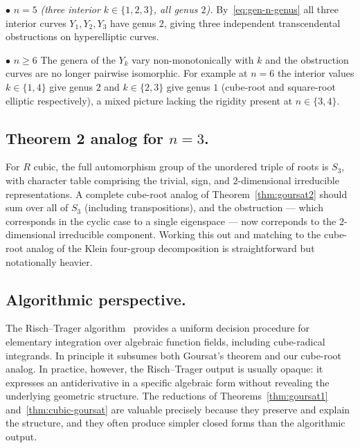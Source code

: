 \documentclass[11pt,a4paper]{article}
\theoremstyle{plain}
\theoremstyle{definition}
\theoremstyle{remark}
\begin{document}
\smallskip\noindent
$\bullet$ $\boxed{n=5}$ \emph{(three interior $k\in\{1,2,3\}$, all genus $2$).} By~\eqref{eq:gen-n-genus} all three interior curves $Y_1, Y_2, Y_3$ have genus $2$, giving three independent transcendental obstructions on hyperelliptic curves.

\smallskip\noindent
$\bullet$ $\boxed{n\geq 6}$ The genera of the $Y_k$ vary non-monotonically with $k$ and the obstruction curves are no longer pairwise isomorphic. For example at $n = 6$ the interior values $k\in\{1,4\}$ give genus $2$ and $k\in\{2,3\}$ give genus $1$ (cube-root and square-root elliptic respectively), a mixed picture lacking the rigidity present at $n\in\{3,4\}$.

\subsection*{Theorem 2 analog for $n=3$.}
For $R$ cubic, the full automorphism group of the unordered triple of roots is $S_3$, with character table comprising the trivial, sign, and $2$-dimensional irreducible representations. A complete cube-root analog of Theorem~\ref{thm:goursat2} should sum over all of $S_3$ (including transpositions), and the obstruction --- which corresponds in the cyclic case to a single eigenspace --- now correponds to the $2$-dimensional irreducible component. Working this out and matching to the cube-root analog of the Klein four-group decomposition is straightforward but notationally heavier.

\subsection*{Algorithmic perspective.}
The Risch--Trager algorithm~\cite{Risch1969,Trager1984,Bronstein2005} provides a uniform decision procedure for elementary integration over algebraic function fields, including cube-radical integrands. In principle it subsumes both Goursat's theorem and our cube-root analog. In practice, however, the Risch--Trager output is usually opaque: it expresses an antiderivative in a specific algebraic form without revealing the underlying geometric structure. The reductions of Theorems~\ref{thm:goursat1} and~\ref{thm:cubic-goursat} are valuable precisely because they preserve and explain the structure, and they often produce simpler closed forms than the algorithmic output.
\end{document}
